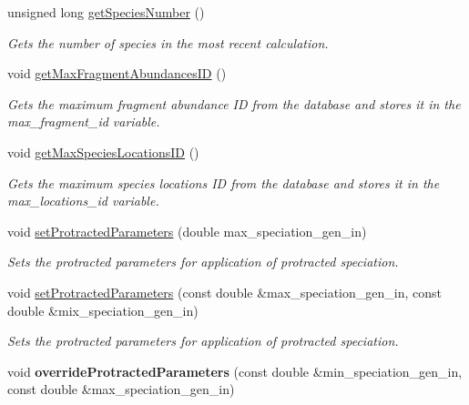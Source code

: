 \begin{DoxyCompactItemize}
unsigned long \hyperlink{class_community_a8523432488d6586521c5994cad4215d8}{get\+Species\+Number} ()
\begin{DoxyCompactList}\small\item\em Gets the number of species in the most recent calculation. \end{DoxyCompactList}\item 
void \hyperlink{class_community_af6fe28e1047ed5b56fde833e4b2b30de}{get\+Max\+Fragment\+Abundances\+ID} ()
\begin{DoxyCompactList}\small\item\em Gets the maximum fragment abundance ID from the database and stores it in the max\+\_\+fragment\+\_\+id variable. \end{DoxyCompactList}\item 
void \hyperlink{class_community_a04d65ed53ea9e2cb6ce02dddccf3d33e}{get\+Max\+Species\+Locations\+ID} ()
\begin{DoxyCompactList}\small\item\em Gets the maximum species locations ID from the database and stores it in the max\+\_\+locations\+\_\+id variable. \end{DoxyCompactList}\item 
void \hyperlink{class_community_aa5643c34557be54ea2674e78a1e0c53a}{set\+Protracted\+Parameters} (double max\+\_\+speciation\+\_\+gen\+\_\+in)
\begin{DoxyCompactList}\small\item\em Sets the protracted parameters for application of protracted speciation. \end{DoxyCompactList}\item 
void \hyperlink{class_community_a3833e048848d21bc0292c05e86b7d5ce}{set\+Protracted\+Parameters} (const double \&max\+\_\+speciation\+\_\+gen\+\_\+in, const double \&mix\+\_\+speciation\+\_\+gen\+\_\+in)
\begin{DoxyCompactList}\small\item\em Sets the protracted parameters for application of protracted speciation. \end{DoxyCompactList}\item 
void {\bfseries override\+Protracted\+Parameters} (const double \&min\+\_\+speciation\+\_\+gen\+\_\+in, const double \&max\+\_\+speciation\+\_\+gen\+\_\+in)\hypertarget{class_community_a132137f2a27a6fad21ada4c94726480a}{}\label{class_community_a132137f2a27a6fad21ada4c94726480a}


\end{DoxyCompactItemize}
